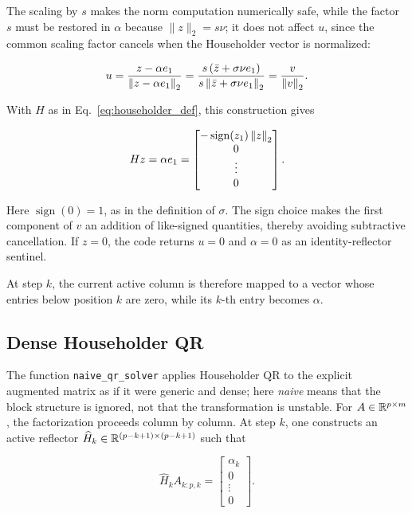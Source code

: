 \noindent The scaling by \(s\) makes the norm computation numerically safe, while the factor \(s\) must be restored in \(\alpha\) because \(\|z\|_2=s\nu\); it does not affect \(u\), since the common scaling factor cancels when the Householder vector is normalized:

\begin{equation}
    u
    = \frac{z-\alpha e_1}{\left\|z-\alpha e_1\right\|_2}
    = \frac{s\left(\bar z+\sigma\nu e_1\right)}
           {s\left\|\bar z+\sigma\nu e_1\right\|_2}
    = \frac{v}{\left\|v\right\|_2}.
\end{equation}

\noindent With $H$ as in Eq.~\eqref{eq:householder_def}, this construction gives

\begin{equation}
    Hz = \alpha e_1
    = 
    \begin{bmatrix}
        -\operatorname{sign}(z_1)\left\|z\right\|_2 \\
        0 \\
        \vdots \\
        0
    \end{bmatrix}.
\end{equation}

\noindent Here $\operatorname{sign}(0)=1$, as in the definition of $\sigma$. The sign choice makes the first component of $v$ an addition of like-signed quantities, thereby avoiding subtractive cancellation. If $z=0$, the code returns $u=0$ and $\alpha=0$ as an identity-reflector sentinel.

\noindent At step $k$, the current active column is therefore mapped to a vector whose entries below position $k$ are zero, while its $k$-th entry becomes $\alpha$.

\subsection{Dense Householder QR}

\noindent The function \texttt{naive\_qr\_solver} applies Householder QR to the
explicit augmented matrix as if it were generic and dense; here \emph{naive}
means that the block structure is ignored, not that the transformation is
unstable. For $A\in\mathbb{R}^{p\times m}$, the factorization proceeds column by
column. At step $k$, one constructs an active reflector
$\widehat H_k\in\mathbb{R}^{(p-k+1)\times(p-k+1)}$ such that

\begin{equation}
    \widehat H_k A_{k:p,k}
    =
    \begin{bmatrix}
        \alpha_k \\ 0 \\ \vdots \\ 0
    \end{bmatrix}.
\end{equation}

